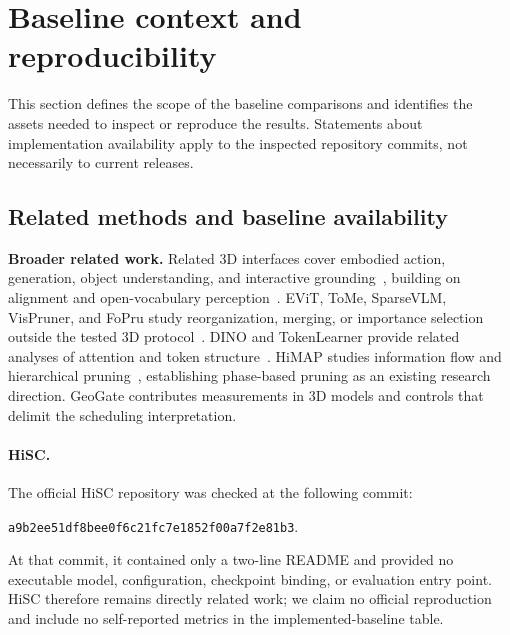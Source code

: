 \section{Baseline context and reproducibility}
\label{sec:supp_repro}
This section defines the scope of the baseline comparisons and identifies the assets needed to inspect or reproduce the results. Statements about implementation availability apply to the inspected repository commits, not necessarily to current releases.




\subsection{Related methods and baseline availability}
\label{sec:supp_baseline_availability}

\textbf{Broader related work.} Related 3D interfaces cover embodied action, generation, object understanding, and interactive grounding~\cite{huang2024leo,zhen20243dvla, qi2024gpt4point,qi2024shapellm,chen2024ll3da,chen2024grounded3dllm}, building on alignment and open-vocabulary perception~\cite{zhou2023uni3d, xue2023ulip,peng2023openscene,jatavallabhula2023conceptfusion}. EViT, ToMe, SparseVLM, VisPruner, and FoPru study reorganization, merging, or importance selection outside the tested 3D protocol~\cite{liang2022evit, bolya2023tome,zhang2024sparsevlm,zhang2024fastervlm,jiang2024fopru}. DINO and TokenLearner provide related analyses of attention and token structure~\cite{caron2021dino,ryoo2021tokenlearner}. HiMAP studies information flow and hierarchical pruning~\cite{yin2025himap}, establishing phase-based pruning as an existing research direction. GeoGate contributes measurements in 3D models and controls that delimit the scheduling interpretation.

\paragraph{HiSC.} The official HiSC repository was checked at the following commit:
{\raggedright\par\noindent
\texttt{a9b2ee51df8bee0f6c21\allowbreak fc7e1852f00a7f2e81b3}.\par}
At that commit, it contained only a two-line README and provided no executable model, configuration, checkpoint binding, or evaluation entry point. HiSC therefore remains directly related work; we claim no official reproduction and include no self-reported metrics in the implemented-baseline table.

